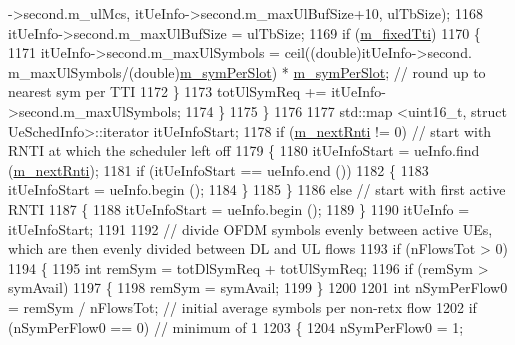 \begin{DoxyCode}
      ->second.m\_ulMcs, itUeInfo->second.m\_maxUlBufSize+10, ulTbSize);
1168                         itUeInfo->second.m\_maxUlBufSize = ulTbSize;
1169                         \textcolor{keywordflow}{if} (\hyperlink{classns3_1_1MmWaveFlexTtiMacScheduler_aac44befc273f7bdb0f0be0efc3d05f34}{m\_fixedTti})
1170                         \{
1171                                 itUeInfo->second.m\_maxUlSymbols = ceil((\textcolor{keywordtype}{double})itUeInfo->second.
      m\_maxUlSymbols/(\textcolor{keywordtype}{double})\hyperlink{classns3_1_1MmWaveFlexTtiMacScheduler_aa911d95e2956fcccca151a7353b8d42f}{m\_symPerSlot}) * \hyperlink{classns3_1_1MmWaveFlexTtiMacScheduler_aa911d95e2956fcccca151a7353b8d42f}{m\_symPerSlot}; \textcolor{comment}{// round up to nearest sym per TTI}
1172                         \}
1173                         totUlSymReq += itUeInfo->second.m\_maxUlSymbols;
1174                 \}
1175         \}
1176 
1177         std::map <uint16\_t, struct UeSchedInfo>::iterator itUeInfoStart;
1178         \textcolor{keywordflow}{if} (\hyperlink{classns3_1_1MmWaveFlexTtiMacScheduler_a447f8e61dd792d50e334f6406caf1530}{m\_nextRnti} != 0)  \textcolor{comment}{// start with RNTI at which the scheduler left off}
1179         \{
1180                 itUeInfoStart = ueInfo.find (\hyperlink{classns3_1_1MmWaveFlexTtiMacScheduler_a447f8e61dd792d50e334f6406caf1530}{m\_nextRnti});
1181                 \textcolor{keywordflow}{if} (itUeInfoStart == ueInfo.end ())
1182                 \{
1183                         itUeInfoStart = ueInfo.begin ();
1184                 \}
1185         \}
1186         \textcolor{keywordflow}{else}    \textcolor{comment}{// start with first active RNTI}
1187         \{
1188                 itUeInfoStart = ueInfo.begin ();
1189         \}
1190         itUeInfo = itUeInfoStart;
1191 
1192         \textcolor{comment}{// divide OFDM symbols evenly between active UEs, which are then evenly divided between DL and UL
       flows}
1193         \textcolor{keywordflow}{if} (nFlowsTot > 0)
1194         \{
1195                 \textcolor{keywordtype}{int} remSym = totDlSymReq + totUlSymReq;
1196                 \textcolor{keywordflow}{if} (remSym > symAvail)
1197                 \{
1198                         remSym = symAvail;
1199                 \}
1200 
1201                 \textcolor{keywordtype}{int} nSymPerFlow0 = remSym / nFlowsTot;  \textcolor{comment}{// initial average symbols per non-retx flow}
1202                 \textcolor{keywordflow}{if} (nSymPerFlow0 == 0)  \textcolor{comment}{// minimum of 1}
1203                 \{
1204                         nSymPerFlow0 = 1;

\end{DoxyCode}
